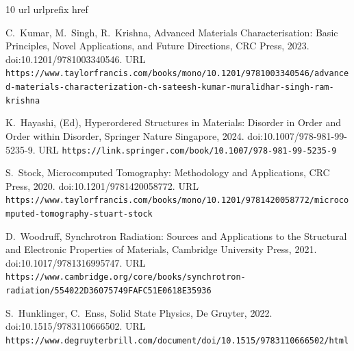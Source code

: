 \documentclass{elsarticle}
\theoremstyle{definition}
\begin{document}
\begin{thebibliography}{10}
\expandafter\ifx\csname url\endcsname\relax
  \def\url#1{\texttt{#1}}\fi
\expandafter\ifx\csname urlprefix\endcsname\relax\def\urlprefix{URL }\fi
\expandafter\ifx\csname href\endcsname\relax
  \def\href#1#2{#2} \def\path#1{#1}\fi

C.~Kumar, M.~Singh, R.~Krishna,
  \href{https://www.taylorfrancis.com/books/mono/10.1201/9781003340546/advanced-materials-characterization-ch-sateesh-kumar-muralidhar-singh-ram-krishna}{Advanced
  Materials Characterisation: Basic Principles, Novel Applications, and Future
  Directions}, CRC Press, 2023.
\newblock \href {https://doi.org/10.1201/9781003340546}
  {\path{doi:10.1201/9781003340546}}.
\newline\urlprefix\url{https://www.taylorfrancis.com/books/mono/10.1201/9781003340546/advanced-materials-characterization-ch-sateesh-kumar-muralidhar-singh-ram-krishna}

K.~Hayashi, (Ed),
  \href{https://link.springer.com/book/10.1007/978-981-99-5235-9}{Hyperordered
  Structures in Materials: Disorder in Order and Order within Disorder},
  Springer Nature Singapore, 2024.
\newblock \href {https://doi.org/10.1007/978-981-99-5235-9}
  {\path{doi:10.1007/978-981-99-5235-9}}.
\newline\urlprefix\url{https://link.springer.com/book/10.1007/978-981-99-5235-9}

S.~Stock,
  \href{https://www.taylorfrancis.com/books/mono/10.1201/9781420058772/microcomputed-tomography-stuart-stock}{Microcomputed
  Tomography: Methodology and Applications}, CRC Press, 2020.
\newblock \href {https://doi.org/10.1201/9781420058772}
  {\path{doi:10.1201/9781420058772}}.
\newline\urlprefix\url{https://www.taylorfrancis.com/books/mono/10.1201/9781420058772/microcomputed-tomography-stuart-stock}

D.~Woodruff,
  \href{https://www.cambridge.org/core/books/synchrotron-radiation/554022D36075749FAFC51E0618E35936}{Synchrotron
  Radiation: Sources and Applications to the Structural and Electronic
  Properties of Materials}, Cambridge University Press, 2021.
\newblock \href {https://doi.org/10.1017/9781316995747}
  {\path{doi:10.1017/9781316995747}}.
\newline\urlprefix\url{https://www.cambridge.org/core/books/synchrotron-radiation/554022D36075749FAFC51E0618E35936}

S.~Hunklinger, C.~Enss,
  \href{https://www.degruyterbrill.com/document/doi/10.1515/9783110666502/html}{Solid
  State Physics}, De Gruyter, 2022.
\newblock \href {https://doi.org/10.1515/9783110666502}
  {\path{doi:10.1515/9783110666502}}.
\newline\urlprefix\url{https://www.degruyterbrill.com/document/doi/10.1515/9783110666502/html}


\end{thebibliography}
\end{document}
